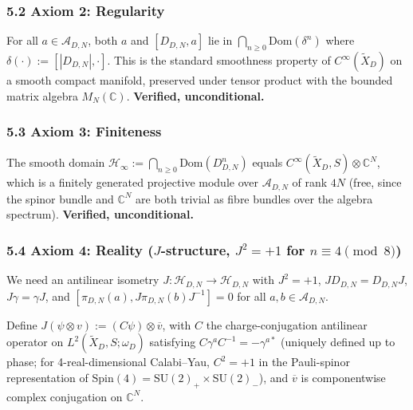 \documentclass[
  11pt,
  a4paper,
]{amsart}
\begin{document}
\hypertarget{axiom-2-regularity}{%
\subsubsection{5.2 Axiom 2: Regularity}\label{axiom-2-regularity}}

For all \(a \in \mathcal{A}_{D,N}\), both \(a\) and \([D_{D,N}, a]\) lie in
\(\bigcap_{n \ge 0} \mathrm{Dom}(\delta^n)\) where
\(\delta(\cdot) := [|D_{D,N}|, \cdot]\). This is the standard smoothness
property of \(C^\infty(\widetilde{X}_D)\) on a smooth compact manifold, preserved
under tensor product with the bounded matrix algebra \(M_N(\mathbb{C})\).
\textbf{Verified, unconditional.}

\hypertarget{axiom-3-finiteness}{%
\subsubsection{5.3 Axiom 3: Finiteness}\label{axiom-3-finiteness}}

The smooth domain \(\mathcal{H}_\infty := \bigcap_{n \ge 0} \mathrm{Dom}(D_{D,N}^n)\)
equals \(C^\infty(\widetilde{X}_D, S) \otimes \mathbb{C}^N\), which is a finitely
generated projective module over \(\mathcal{A}_{D,N}\) of rank \(4N\) (free, since
the spinor bundle and \(\mathbb{C}^N\) are both trivial as fibre bundles over the
algebra spectrum). \textbf{Verified, unconditional.}

\hypertarget{axiom-4-reality-j-structure-j2-1-for-n-equiv-4-pmod-8}{%
\subsubsection{\texorpdfstring{5.4 Axiom 4: Reality (\(J\)-structure, \(J^2 = +1\) for \(n \equiv 4 \pmod 8\))}{5.4 Axiom 4: Reality (J-structure, J\^{}2 = +1 for n \textbackslash equiv 4 \textbackslash pmod 8)}}\label{axiom-4-reality-j-structure-j2-1-for-n-equiv-4-pmod-8}}

We need an antilinear isometry \(J : \mathcal{H}_{D,N} \to \mathcal{H}_{D,N}\)
with \(J^2 = +1\), \(J D_{D,N} = D_{D,N} J\), \(J\gamma = \gamma J\), and
\([\pi_{D,N}(a), J\pi_{D,N}(b)J^{-1}] = 0\) for all \(a, b \in \mathcal{A}_{D,N}\).

Define \(J(\psi \otimes v) := (C\psi) \otimes \overline{v}\), with \(C\) the
charge-conjugation antilinear operator on \(L^2(\widetilde{X}_D, S; \omega_D)\)
satisfying \(C\gamma^a C^{-1} = -\gamma^{a*}\) (uniquely defined up to phase; for
4-real-dimensional Calabi--Yau, \(C^2 = +1\) in the Pauli-spinor representation
of \(\mathrm{Spin}(4) = \mathrm{SU}(2)_+ \times \mathrm{SU}(2)_-\)), and
\(\overline{v}\) is componentwise complex conjugation on \(\mathbb{C}^N\).
\end{document}
